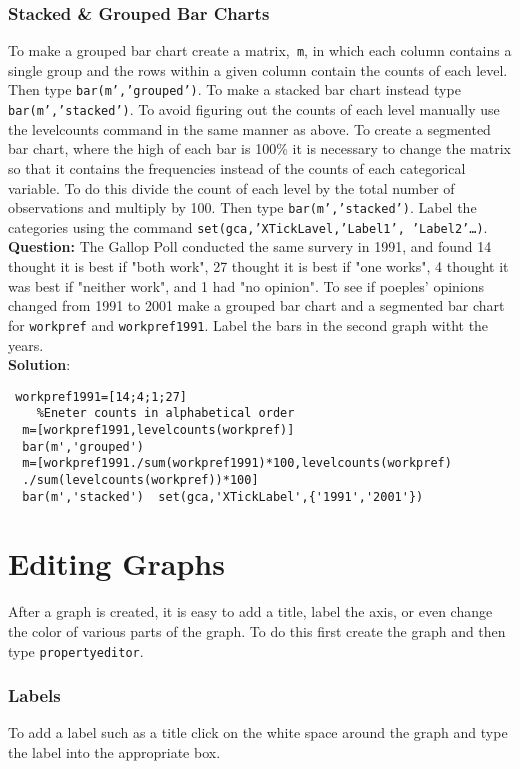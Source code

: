 \documentclass[10pt]{article}
\begin{document}
 \subsubsection{Stacked \& Grouped Bar Charts}
To make a grouped bar chart create a matrix,\texttt{ m}, in which each column contains a single group and the rows within a given column contain the counts of each level. Then type \texttt{bar(m','grouped')}. To make a stacked bar chart instead type \texttt{bar(m','stacked')}. To avoid figuring out the counts of each level manually use the levelcounts command in the same manner as above. To create a segmented bar chart, where the high of each bar is 100\% it is necessary to change the matrix so that it contains the frequencies instead of the counts of each categorical variable. To do this divide the count of each level by the total number of observations and multiply by 100. Then type \texttt{bar(m','stacked')}. Label the categories using the command \texttt{set(gca,'XTickLavel,{'Label1', 'Label2'…})}.
\\\textbf{Question:}
The Gallop Poll conducted the same survery in 1991, and found 14 thought it is best if "both work", 27 thought it is best if "one works", 4 thought it was best if "neither work", and 1 had "no opinion".
 To see if poeples' opinions changed from 1991 to 2001 make a grouped bar chart and a segmented bar chart for \texttt{workpref} and \texttt{workpref1991}. Label the bars in the second graph witht the years.
 \\\textbf{Solution}: 
  \begin{verbatim} workpref1991=[14;4;1;27] 
    %Eneter counts in alphabetical order
  m=[workpref1991,levelcounts(workpref)]
  bar(m','grouped')
  m=[workpref1991./sum(workpref1991)*100,levelcounts(workpref)
  ./sum(levelcounts(workpref))*100]
  bar(m','stacked')  set(gca,'XTickLabel',{'1991','2001'})
 \end{verbatim}
\section{Editing Graphs}
After a graph is created, it is easy to add a title, label the axis, or even change the color of various parts of the graph. To do this first create the graph and then type \texttt{propertyeditor}.
\subsubsection{Labels}
To add a label such as a title click on the white space around the graph and type the label into the appropriate box. 
\end{document}

